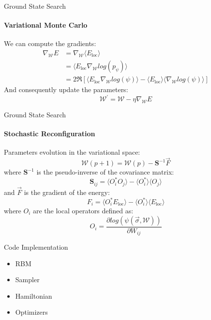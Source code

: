 \documentclass{beamer}
\begin{document}
\begin{frame}{Ground State Search}
\framesubtitle{Variational Monte Carlo}
We can compute the gradients:
\begin{equation*}
\begin{aligned}
    \nabla_{\mathcal{W}} E &= \nabla_{\mathcal{W}} \langle E_{\text{loc}} \rangle \\
    &= \langle E_{\text{loc}} \nabla_{\mathcal{W}} log(p_{\psi}) \rangle \\
    &= 2 \mathfrak{R} \left[ \langle E_{\text{loc}} \nabla_{\mathcal{W}} log(\psi) \rangle - \langle E_{\text{loc}} \rangle \langle \nabla_{\mathcal{W}} log(\psi) \rangle \right]
\end{aligned}
\end{equation*}
And consequently update the parameters:
$$\mathcal{W}^{'} = \mathcal{W} - \eta \nabla_{\mathcal{W}} E$$
\end{frame}

\begin{frame}{Ground State Search}
\framesubtitle{Stochastic Reconfiguration}
Parameters evolution in the variational space:
$$\mathcal{W}\left( p + 1\right) = \mathcal{W}\left( p \right) - \mathbf{S}^{-1} \vec{F}$$
where $\mathbf{S}^{-1}$ is the pseudo-inverse of the covariance matrix:
$$\mathbf{S}_{ij} = \langle O_i^{*} O_j \rangle - \langle O_i^{*} \rangle \langle O_j \rangle$$
and $\vec{F}$ is the gradient of the energy:
$$F_i = \langle O_i^{*} E_{\text{loc}} \rangle - \langle O_i^{*} \rangle \langle E_{\text{loc}} \rangle$$
where $O_i$ are the local operators defined as:
$$O_i = \frac{\partial log\left(\psi\left( \vec{\sigma}, \mathcal{W} \right)\right)}{\partial W_{ij}}$$

\end{frame}

\begin{chapter}{}{Code Implementation}
\begin{itemize}
    \item RBM
    \item Sampler
    \item Hamiltonian
    \item Optimizers
\end{itemize}
\end{chapter}
\end{document}
